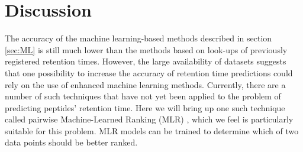 \documentclass[a4paper]{article}
\begin{document}





\section{Discussion}

The accuracy of the machine learning-based methods described in
section \ref{sec:ML} is still much lower than the methods based on
look-ups of previously registered retention times. However, the large
availability of datasets suggests that one possibility to increase the
accuracy of retention time predictions could rely on the use of
enhanced machine learning methods. Currently, there are a number of
such techniques that have not yet been applied to the problem of
predicting peptides' retention time. Here we will bring up one such
technique called pairwise Machine-Learned Ranking (MLR)
\cite{liu2009learning}, which we feel is particularly suitable for
this problem. MLR models can be trained to determine which of two data
points should be better ranked. 
\end{document}

